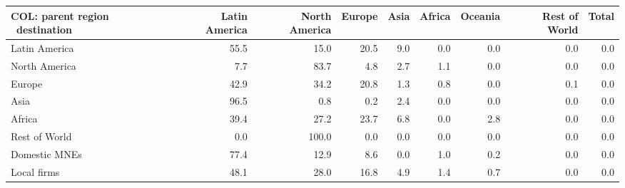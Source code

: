 \begin{tabular}{lrrrrrrrr}
\toprule
COL: parent region \ destination & Latin America & North America & Europe & Asia & Africa & Oceania & Rest of World & Total \\
\midrule
Latin America & 55.5 & 15.0 & 20.5 & 9.0 & 0.0 & 0.0 & 0.0 & 0.0 \\
North America & 7.7 & 83.7 & 4.8 & 2.7 & 1.1 & 0.0 & 0.0 & 0.0 \\
Europe & 42.9 & 34.2 & 20.8 & 1.3 & 0.8 & 0.0 & 0.1 & 0.0 \\
Asia & 96.5 & 0.8 & 0.2 & 2.4 & 0.0 & 0.0 & 0.0 & 0.0 \\
Africa & 39.4 & 27.2 & 23.7 & 6.8 & 0.0 & 2.8 & 0.0 & 0.0 \\
Rest of World & 0.0 & 100.0 & 0.0 & 0.0 & 0.0 & 0.0 & 0.0 & 0.0 \\
Domestic MNEs & 77.4 & 12.9 & 8.6 & 0.0 & 1.0 & 0.2 & 0.0 & 0.0 \\
Local firms & 48.1 & 28.0 & 16.8 & 4.9 & 1.4 & 0.7 & 0.0 & 0.0 \\
\bottomrule
\end{tabular}
